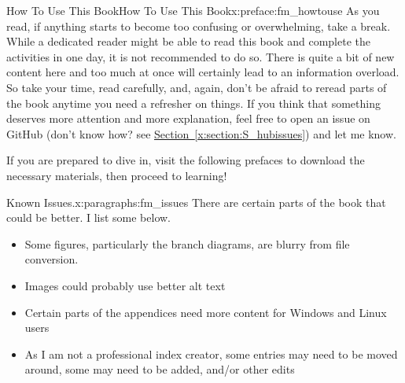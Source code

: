 \documentclass[oneside,10pt,]{book}
\newcommand{\xreffont}{\relax}
\begin{document}
\begin{preface}{How To Use This Book}{}{How To Use This Book}{}{}{x:preface:fm_howtouse}
As you read, if anything starts to become too confusing or overwhelming, take a break. While a dedicated reader might be able to read this book and complete the activities in one day, it is not recommended to do so. There is quite a bit of new content here and too much at once will certainly lead to an information overload. So take your time, read carefully, and, again, don't be afraid to reread parts of the book anytime you need a refresher on things. If you think that something deserves more attention and more explanation, feel free to open an issue on GitHub (don't know how? see \hyperref[x:section:S_hubissues]{Section~{\xreffont\ref{x:section:S_hubissues}}}) and let me know.%
\par
If you are prepared to dive in, visit the following prefaces to download the necessary materials, then proceed to learning!%
\begin{paragraphs}{Known Issues.}{x:paragraphs:fm_issues}%
There are certain parts of the book that could be better. I list some below.%
\begin{itemize}[label=\textbullet]
\item{}Some figures, particularly the branch diagrams, are blurry from file conversion.%
\item{}Images could probably use better alt text%
\item{}Certain parts of the appendices need more content for Windows and Linux users%
\item{}As I am not a professional index creator, some entries may need to be moved around, some may need to be added, and\slash{}or other edits%
\end{itemize}
%
\end{paragraphs}%
\end{preface}
%
%
\typeout{************************************************}
\typeout{************************************************}
%
\end{document}
